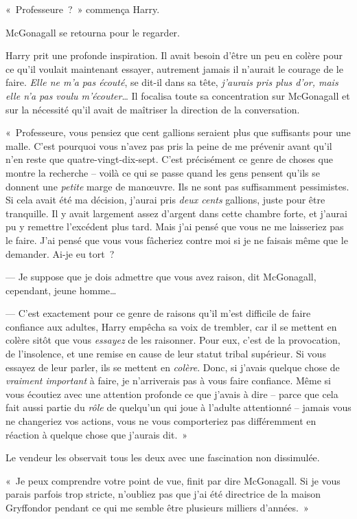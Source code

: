 «~Professeure~?~» commença Harry.

McGonagall se retourna pour le regarder.

Harry prit une profonde inspiration.
Il avait besoin d'être un peu en colère pour ce qu'il voulait maintenant essayer, autrement jamais il n'aurait le courage de le faire.
\emph{Elle ne m'a pas écouté}, se dit-il dans sa tête, \emph{j'aurais pris plus d'or, mais elle n'a pas voulu m'écouter}…
Il focalisa toute sa concentration sur McGonagall et sur la nécessité qu'il avait de maîtriser la direction de la conversation.

«~Professeure, vous pensiez que cent gallions seraient plus que suffisants pour une malle.
C'est pourquoi vous n'avez pas pris la peine de me prévenir avant qu'il n'en reste que quatre-vingt-dix-sept.
C'est précisément ce genre de choses que montre la recherche --
voilà ce qui se passe quand les gens pensent qu'ils se donnent une \emph{petite} marge de manœuvre.
Ils ne sont pas suffisamment pessimistes.
Si cela avait été ma décision, j'aurai pris \emph{deux cents} gallions, juste pour être tranquille.
Il y avait largement assez d'argent dans cette chambre forte, et j'aurai pu y remettre l'excédent plus tard.
Mais j'ai pensé que vous ne me laisseriez pas le faire.
J'ai pensé que vous vous fâcheriez contre moi si je ne faisais même que le demander.
Ai-je eu tort~?

--- Je suppose que je dois admettre que vous avez raison, dit McGonagall, cependant, jeune homme…

--- C'est exactement pour ce genre de raisons qu'il m'est difficile de faire confiance aux adultes, Harry empêcha sa voix de trembler,
car il se mettent en colère sitôt que vous \emph{essayez} de les raisonner.
Pour eux, c'est de la provocation, de l'insolence, et une remise en cause de leur statut tribal supérieur.
Si vous essayez de leur parler, ils se mettent en \emph{colère}.
Donc, si j'avais quelque chose de \emph{vraiment important} à faire, je n'arriverais pas à vous faire confiance.
Même si vous écoutiez avec une attention profonde ce que j'avais à dire -- parce que cela fait aussi partie du \emph{rôle} de quelqu'un qui joue à l'adulte attentionné -- jamais vous ne changeriez vos actions, vous ne vous comporteriez pas différemment en réaction à quelque chose que j'aurais dit.~»

Le vendeur les observait tous les deux avec une fascination non dissimulée.

«~Je peux comprendre votre point de vue, finit par dire McGonagall.
Si je vous parais parfois trop stricte, n'oubliez pas que j'ai été directrice de la maison Gryffondor pendant ce qui me semble être plusieurs milliers d'années.~»

